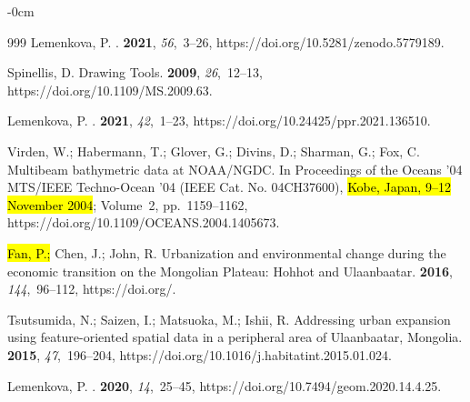 \documentclass[geosciences,article,accept,pdftex,oneauthor]{Definitions/mdpi}
\begin{document}
\begin{adjustwidth}{-\extralength}{0cm}
\begin{thebibliography}{999}
Lemenkova, P.
.
 {\bf 2021}, {\em 56},~3--26, https://doi.org/10.5281/zenodo.5779189.

Spinellis, D.
\newblock Drawing Tools.
 {\bf 2009}, {\em 26},~12--13, https://doi.org/10.1109/MS.2009.63.

Lemenkova, P.
.
 {\bf 2021}, {\em 42},~1--23, https://doi.org/10.24425/ppr.2021.136510.

Virden, W.; Habermann, T.; Glover, G.; Divins, D.; Sharman, G.; Fox, C.
\newblock Multibeam bathymetric data at NOAA/NGDC.
\newblock In Proceedings of the Oceans '04 MTS/IEEE Techno-Ocean '04 (IEEE Cat.
  No. 04CH37600), \hl{Kobe, Japan, 9--12 November 2004}; Volume~2, pp.~1159--1162, https://doi.org/10.1109/OCEANS.2004.1405673.



\hl{Fan, P.;} Chen, J.; John, R.
\newblock Urbanization and environmental change during the economic transition
  on the Mongolian Plateau: Hohhot and Ulaanbaatar.
 {\bf 2016}, {\em 144},~96--112,
  https://doi.org/{\href{https://doi.org/10.1016/j.envres.2015.09.020}{}}.

Tsutsumida, N.; Saizen, I.; Matsuoka, M.; Ishii, R.
\newblock Addressing urban expansion using feature-oriented spatial data in
  a peripheral area of Ulaanbaatar, Mongolia.
 {\bf 2015}, {\em 47},~196--204, https://doi.org/10.1016/j.habitatint.2015.01.024.

Lemenkova, P.
.
 {\bf 2020}, {\em
  14},~25--45, https://doi.org/10.7494/geom.2020.14.4.25.


\end{thebibliography}
\end{adjustwidth}
\end{document}
